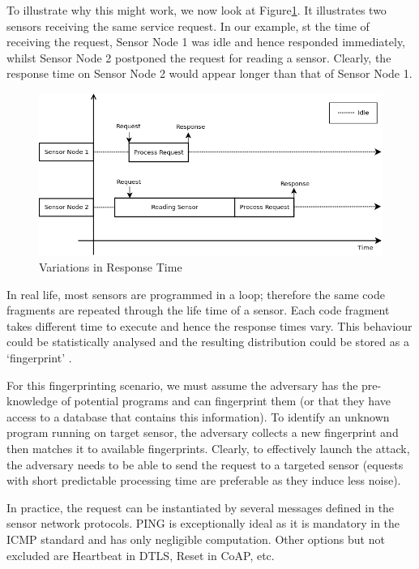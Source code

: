 \documentclass{article}
\begin{document}
To illustrate why this might work, we now look at Figure\ref{FingerprintTheory}. It illustrates two sensors receiving the same service request. In our example, st the time of receiving the request, Sensor Node 1 was idle and hence responded immediately, whilst Sensor Node 2 postponed the request for reading a sensor. Clearly, the response time on Sensor Node 2 would appear longer than that of Sensor Node 1.

\begin{figure}
	\center
	\includegraphics[width=\textwidth]{fig/PingProbe_Theory.png}
	\caption{Variations in Response Time\label{FingerprintTheory}}
\end{figure}

In real life, most sensors are programmed in a loop; therefore the same code fragments are repeated through the life time of a sensor. Each code fragment takes different time to execute and hence the response times vary. This behaviour could be statistically analysed and the resulting distribution could be stored as a `fingerprint' .


For this fingerprinting scenario, we must assume the adversary has the pre-knowledge of potential programs and can fingerprint them (or that they have access to a database that contains this information). To identify an unknown program running on target sensor, the adversary collects a new fingerprint and then matches it to available fingerprints. Clearly, to effectively launch the attack, the adversary needs to be able to send the request to a targeted sensor (equests with short predictable processing time are preferable as they induce less noise). 

In practice, the request can be instantiated by several messages defined in the sensor network protocols. PING is exceptionally ideal as it is mandatory in the ICMP standard\cite{rfc4433} and has only negligible computation. Other options but not excluded are Heartbeat in DTLS\cite{rfc6520}, Reset in CoAP\cite{rfc7252}, etc.
\end{document}

